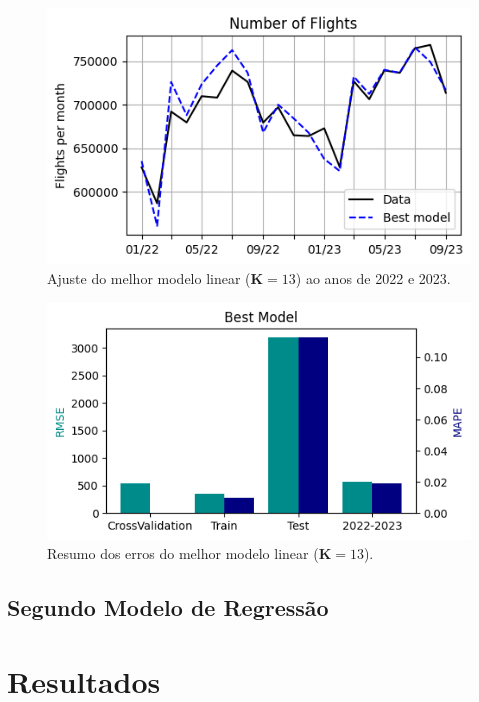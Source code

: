 \documentclass[final,5p]{elsarticle}
\numberwithin{equation}{section}
\begin{document}
        \begin{figure}[hbt!]
            \includegraphics[width=0.95\columnwidth]{B3_BestModel22_23.png}
            \caption{Ajuste do melhor modelo linear ($\textbf{K} = 13$) ao anos de 2022 e 2023.}
            \label{fig:melhor_modelo_2223}
        \end{figure}

        \begin{figure}[hbt!]
            \includegraphics[width=0.95\columnwidth]{B3_RMSE.png}
            \caption{Resumo dos erros do melhor modelo linear ($\textbf{K} = 13$).}
            \label{fig:erros_melhor_modelo}
        \end{figure}

    \subsection{Segundo Modelo de Regressão}


\section{Resultados}
\end{document}
